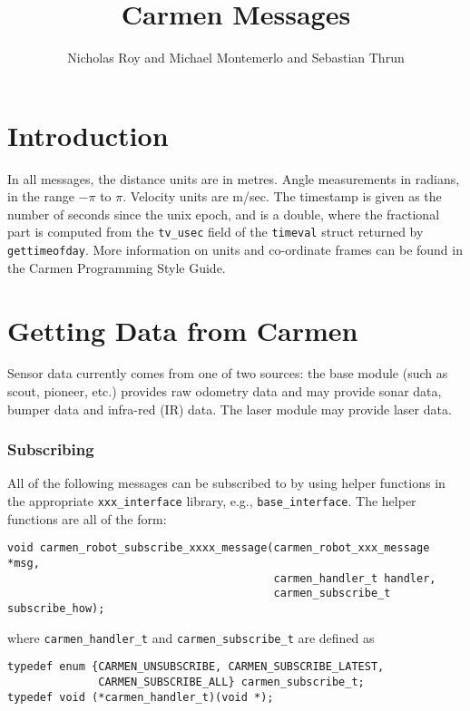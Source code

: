 \documentclass{article}
\title{Carmen Messages}
\author{Nicholas Roy and Michael Montemerlo and Sebastian Thrun}
\begin{document}
\maketitle

\section{Introduction}

In all messages, the distance units are in metres. Angle measurements in
radians, in the range $-\pi$ to $\pi$. Velocity units are m/sec. The timestamp
is given as the number of seconds since the unix epoch, and is a double, where
the fractional part is computed from the \verb!tv_usec! field of the
\verb!timeval! struct returned by \verb!gettimeofday!. More information on
units and co-ordinate frames can be found in the Carmen Programming Style
Guide. 

\section{Getting Data from Carmen}

Sensor data currently comes from one of two sources: the base module (such as
scout, pioneer, etc.) provides raw odometry data and may provide sonar data,
bumper data and infra-red (IR) data. The laser module may provide laser data.

\subsubsection{Subscribing}

All of the following messages can be subscribed to by using helper functions
in the appropriate \verb!xxx_interface! library, e.g., \verb!base_interface!.
The helper functions are all of the form:

\begin{verbatim}
void carmen_robot_subscribe_xxxx_message(carmen_robot_xxx_message *msg,
                                         carmen_handler_t handler, 
                                         carmen_subscribe_t subscribe_how);
\end{verbatim}

where \verb!carmen_handler_t! and \verb!carmen_subscribe_t! are defined as

\begin{verbatim}
typedef enum {CARMEN_UNSUBSCRIBE, CARMEN_SUBSCRIBE_LATEST, 
              CARMEN_SUBSCRIBE_ALL} carmen_subscribe_t;
typedef void (*carmen_handler_t)(void *);
\end{verbatim}
\end{document}
